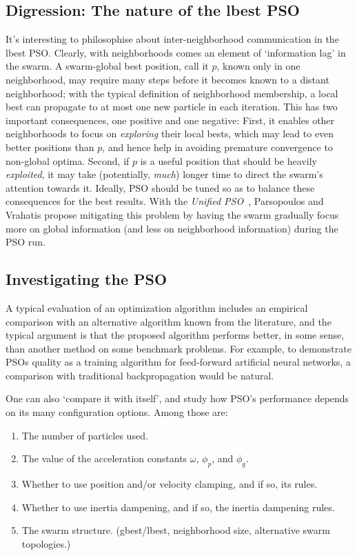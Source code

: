 \documentclass[a4paper,final,9pt]{article}
\begin{document}
\subsection{Digression: The nature of the lbest PSO}
It's interesting to philosophise about inter-neighborhood communication in the
lbest PSO.  Clearly, with neighborhoods comes an element of `information lag'
in the swarm. A swarm-global best position, call it $p$, known only in one
neighborhood, may require many steps before it becomes known to a distant
neighborhood; with the typical definition of neighborhood membership, a local
best can propagate to at most one new particle in each iteration.  This has
two important consequences, one positive and one negative: First, it enables
other neighborhoods to focus on \emph{exploring} their local bests, which may
lead to even better positions than $p$, and hence help in avoiding premature
convergence to non-global optima. Second, if $p$ is a useful position that
should be heavily \emph{exploited}, it may take (potentially, \emph{much})
longer time to direct the swarm's attention towards it.  Ideally, PSO should
be tuned so as to balance these consequences for the best results.  With the
\emph{Unified PSO}~\cite{unified}, Parsopoulos and Vrahatis propose
mitigating this problem by having the swarm gradually focus more on global
information (and less on neighborhood information) during the PSO run.

\subsection{Investigating the PSO}
A typical evaluation of an optimization algorithm includes an empirical
comparison with an alternative algorithm known from the literature, and the
typical argument is that the proposed algorithm performs better, in some
sense, than another method on some benchmark problems. For example, to
demonstrate PSOs quality as a training algorithm for feed-forward artificial
neural networks, a comparison with traditional backpropagation would be
natural.  

One can also `compare it with itself', and study how PSO's performance depends
on its many configuration options. Among those are:
\begin{enumerate}
  \item The number of particles used.
  \item The value of the acceleration constants $\omega$, $\phi_p$, and
    $\phi_g$.
  \item Whether to use position and/or velocity clamping, and if so, its
    rules.
  \item Whether to use inertia dampening, and if so, the inertia dampening
    rules.
  \item The swarm structure. (gbest/lbest, neighborhood size, alternative
    swarm topologies.)
\end{enumerate}
\end{document}
